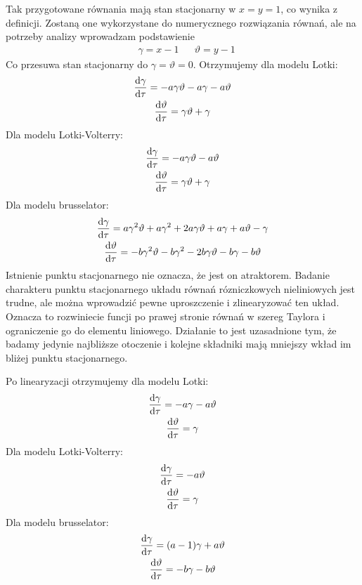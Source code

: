 \documentclass[10pt, a4paper, twoside, onecolumn]{article}
\numberwithin{equation}{section}
\begin{document}
	Tak przygotowane równania mają stan stacjonarny w \(x=y=1\), co wynika z definicji. Zostaną one wykorzystane do numerycznego rozwiązania równań, ale na potrzeby analizy wprowadzam podstawienie
	\begin{align*}
		& \gamma=x-1 && \vartheta=y-1
	\end{align*}
	Co przesuwa stan stacjonarny do \(\gamma=\vartheta=0\). Otrzymujemy dla modelu Lotki:
	\begin{gather}
		\dv{\gamma}{\tau}=-a\gamma\vartheta-a\gamma-a\vartheta \\
		\dv{\vartheta}{\tau}=\gamma\vartheta+\gamma
	\end{gather}
	Dla modelu Lotki-Volterry:
	\begin{gather}
		\dv{\gamma}{\tau}=-a\gamma\vartheta-a\vartheta \\
		\dv{\vartheta}{\tau}=\gamma\vartheta+\gamma
	\end{gather}
	Dla modelu brusselator:
	\begin{gather}
		\dv{\gamma}{\tau}=a\gamma^{2}\vartheta+a\gamma^{2}+2a\gamma\vartheta+a\gamma+a\vartheta-\gamma \\
		\dv{\vartheta}{\tau}=-b\gamma^{2}\vartheta-b\gamma^{2}-2b\gamma\vartheta-b\gamma-b\vartheta
	\end{gather}
	Istnienie punktu stacjonarnego nie oznacza, że jest on atraktorem. Badanie charakteru punktu stacjonarnego układu równań rózniczkowych nieliniowych jest trudne, ale można wprowadzić pewne uproszczenie i zlinearyzować ten układ. Oznacza to rozwiniecie funcji po prawej stronie równań w szereg Taylora i ograniczenie go do elementu liniowego. Działanie to jest uzasadnione tym, że badamy jedynie najbliższe otoczenie i kolejne składniki mają mniejszy wkład im bliżej punktu stacjonarnego. \par
	Po linearyzacji otrzymujemy dla modelu Lotki:
	\begin{gather}
		\dv{\gamma}{\tau}=-a\gamma-a\vartheta \\
		\dv{\vartheta}{\tau}=\gamma
	\end{gather}
	Dla modelu Lotki-Volterry:
	\begin{gather}
		\dv{\gamma}{\tau}=-a\vartheta \\
		\dv{\vartheta}{\tau}=\gamma
	\end{gather}
	Dla modelu brusselator:
	\begin{gather}
		\dv{\gamma}{\tau}=(a-1)\gamma+a\vartheta \\
		\dv{\vartheta}{\tau}=-b\gamma-b\vartheta
	\end{gather}
\end{document}
